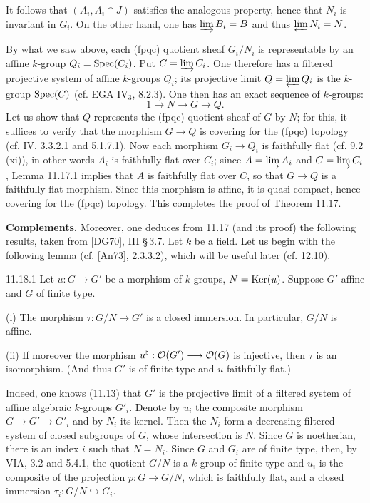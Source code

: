 It follows that $(A_i,A_i\cap J)$ satisfies the analogous property, hence that $N_i$ is invariant in $G_i$. On the other hand, one has $\varinjlim B_i=B$ and thus $\varprojlim N_i=N$.

By what we saw above, each (fpqc) quotient sheaf $G_i/N_i$ is representable by an affine $k$-group $Q_i=\operatorname{Spec}(C_i)$. Put $C=\varinjlim C_i$. One therefore has a filtered projective system of affine $k$-groups $Q_i$; its projective limit $Q=\varprojlim Q_i$ is the $k$-group $\operatorname{Spec}(C)$ (cf. EGA IV$_3$, 8.2.3). One then has an exact sequence of $k$-groups:
\[
1\to N\to G\to Q.
\]
Let us show that $Q$ represents the (fpqc) quotient sheaf of $G$ by $N$; for this, it suffices to verify that the morphism $G\to Q$ is covering for the (fpqc) topology (cf. IV, 3.3.2.1 and 5.1.7.1). Now each morphism $G_i\to Q_i$ is faithfully flat (cf. 9.2 (xi)), in other words $A_i$ is faithfully flat over $C_i$; since $A=\varinjlim A_i$ and $C=\varinjlim C_i$, Lemma 11.17.1 implies that $A$ is faithfully flat over $C$, so that $G\to Q$ is a faithfully flat morphism. Since this morphism is affine, it is quasi-compact, hence covering for the (fpqc) topology. This completes the proof of Theorem 11.17.

\label{VIB.11.18}\textbf{Complements.}
Moreover, one deduces from 11.17 (and its proof) the following results, taken from [DG70], III \S\,3.7. Let $k$ be a field. Let us begin with the following lemma (cf. [An73], 2.3.3.2), which will be useful later (cf. 12.10).

\begin{lemma}{11.18.1}\label{VIB.11.18.1}
Let $u:G\to G'$ be a morphism of $k$-groups, $N=\operatorname{Ker}(u)$. Suppose $G'$ affine and $G$ of finite type.

(i) The morphism $\tau:G/N\to G'$ is a closed immersion. In particular, $G/N$ is affine.

(ii) If moreover the morphism $u^\natural:\mathcal{O}(G')\longrightarrow\mathcal{O}(G)$ is injective, then $\tau$ is an isomorphism. (And thus $G'$ is of finite type and $u$ faithfully flat.)
\end{lemma}
Indeed, one knows (11.13) that $G'$ is the projective limit of a filtered system of affine algebraic $k$-groups $G'_i$. Denote by $u_i$ the composite morphism $G\to G'\to G'_i$ and by $N_i$ its kernel. Then the $N_i$ form a decreasing filtered system of closed subgroups of $G$, whose intersection is $N$. Since $G$ is noetherian, there is an index $i$ such that $N=N_i$. Since $G$ and $G_i$ are of finite type, then, by VIA, 3.2 and 5.4.1, the quotient $G/N$ is a $k$-group of finite type and $u_i$ is the composite of the projection $p:G\to G/N$, which is faithfully flat, and a closed immersion $\tau_i:G/N\hookrightarrow G_i$.

